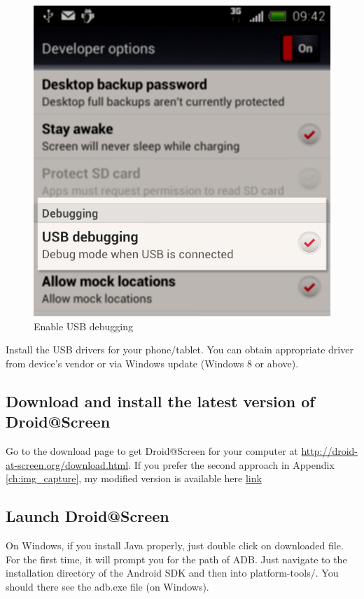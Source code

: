     \begin{figure}[H]
		\centering
		\includegraphics[scale=0.65]{Chapters/Fig/usb-db.png}
		\caption{Enable USB debugging}
		\label{fig:usb-db}
	\end{figure}
	
Install the USB drivers for your phone/tablet. You can obtain appropriate driver from device's vendor or via Windows update (Windows 8 or above).

\subsection{Download and install the latest version of Droid@Screen}
Go to the download page to get Droid@Screen for your computer at \url{http://droid-at-screen.org/download.html}.
If you prefer the second approach in Appendix \ref{ch:img_capture}, my modified version is available here \url{link}

\subsection{Launch Droid@Screen}
On Windows, if you install Java properly, just double click on downloaded file.
\newline
For the first time, it will prompt you for the path of ADB. Just navigate to the installation directory of the Android SDK and then into platform-tools/. You should there see the adb.exe file (on Windows).

